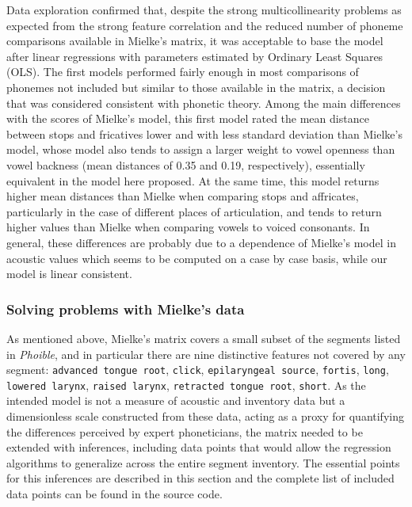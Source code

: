 \documentclass[a4paper]{article}
\begin{document}
Data exploration confirmed that, despite the strong multicollinearity
problems as expected from the strong feature correlation and the reduced
number of phoneme comparisons available in Mielke's matrix, it was
acceptable to base the model after linear regressions with parameters
estimated by Ordinary Least Squares (OLS). The first models performed
fairly enough in most comparisons of phonemes not included but similar
to those available in the matrix, a decision that was considered
consistent with phonetic theory. Among the main differences with the
scores of Mielke's model, this first model rated the mean distance
between stops and fricatives lower and with less standard deviation than
Mielke's model, whose model also tends to assign a larger weight to
vowel openness than vowel backness (mean distances of 0.35 and 0.19,
respectively), essentially equivalent in the model here proposed. At the
same time, this model returns higher mean distances than Mielke when
comparing stops and affricates, particularly in the case of different
places of articulation, and tends to return higher values than Mielke
when comparing vowels to voiced consonants. In general, these
differences are probably due to a dependence of Mielke's model in
acoustic values which seems to be computed on a case by case basis,
while our model is linear consistent.

\subsubsection{Solving problems with Mielke's
data}\label{solving-problems-with-mielkes-data}

As mentioned above, Mielke's matrix covers a small subset of the
segments listed in \emph{Phoible}, and in particular there are nine
distinctive features not covered by any segment:
\texttt{advanced\ tongue\ root}, \texttt{click},
\texttt{epilaryngeal\ source}, \texttt{fortis}, \texttt{long},
\texttt{lowered\ larynx}, \texttt{raised\ larynx},
\texttt{retracted\ tongue\ root}, \texttt{short}. As the intended model
is not a measure of acoustic and inventory data but a dimensionless
scale constructed from these data, acting as a proxy for quantifying the
differences perceived by expert phoneticians, the matrix needed to be
extended with inferences, including data points that would allow the
regression algorithms to generalize across the entire segment inventory.
The essential points for this inferences are described in this section
and the complete list of included data points can be found in the source
code.
\end{document}
